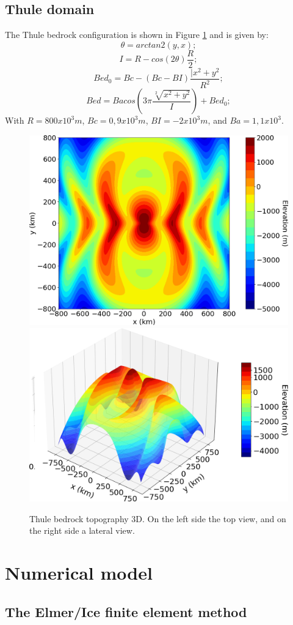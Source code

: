 \documentclass{article}
\begin{document}
\subsection{Thule domain}
The Thule bedrock configuration is shown in Figure \ref{Thule_3D} and is given by:
\begin{equation}
	\theta=arctan2(y,x);
\end{equation}
\begin{equation}
	I=R-cos(2\theta)\frac{R}{2};
\end{equation}
\begin{equation}
	Bed_0=Bc-(Bc-BI)\frac{|x^2+y^2}{R^2};
\end{equation}
\begin{equation}
	Bed=Bacos(3\pi\frac{\sqrt[2]{x^2+y^2}}{I})+Bed_0;
\end{equation}
With $R=800 x 10^3 m$, $Bc=0,9 x 10^3 m$, $BI=-2 x 10^3 m$, and $Ba=1,1 x 10^3$.
\begin{figure}[!h]
	\centering
	\includegraphics[width=0.45\linewidth]{../fig/Thule_2D}
	\includegraphics[width=0.45\linewidth]{../fig/Thule_3D}
	\caption{Thule bedrock topography 3D. On the left side the top view, and on the right side a lateral view.}
	\label{Thule_3D}
\end{figure}

 \section{Numerical model}
 \subsection{The Elmer/Ice finite element method}
\end{document}
